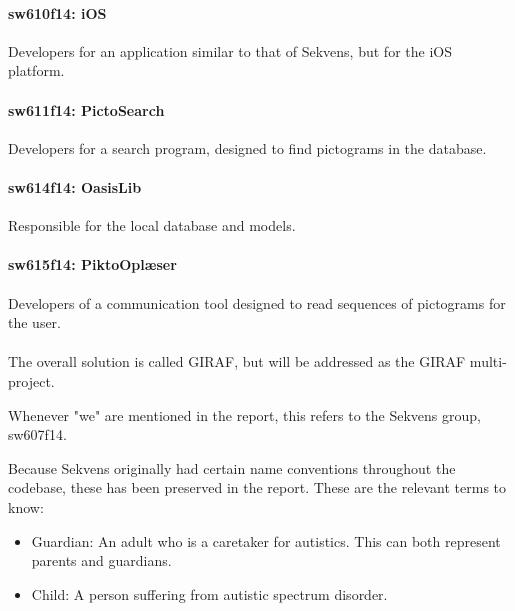 \paragraph{sw610f14: iOS}
Developers for an application similar to that of Sekvens, but for the iOS platform.
\paragraph{sw611f14: PictoSearch}
Developers for a search program, designed to find pictograms in the database.
\paragraph{sw614f14: OasisLib}
Responsible for the local database and models.
\paragraph{sw615f14: PiktoOplæser}
Developers of a communication tool designed to read sequences of pictograms for the user.\\
\\
The overall solution is called GIRAF, but will be addressed as the GIRAF multi-project.

Whenever "we" are mentioned in the report, this refers to the Sekvens group, sw607f14.

Because Sekvens originally had certain name conventions throughout the codebase, these has been preserved in the report. These are the relevant terms to know:

\begin{itemize}
\item Guardian: An adult who is a caretaker for autistics. This can both represent parents and guardians.
\item Child: A person suffering from autistic spectrum disorder.
\end{itemize}
